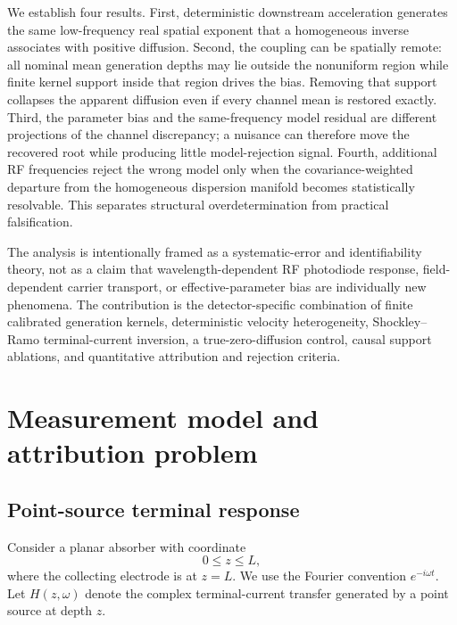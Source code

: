 \documentclass[aps,pra,twocolumn,superscriptaddress,nofootinbib]{revtex4-2}
\begin{document}
We establish four results. First, deterministic downstream acceleration generates the same low-frequency real spatial exponent that a homogeneous inverse associates with positive diffusion. Second, the coupling can be spatially remote: all nominal mean generation depths may lie outside the nonuniform region while finite kernel support inside that region drives the bias. Removing that support collapses the apparent diffusion even if every channel mean is restored exactly. Third, the parameter bias and the same-frequency model residual are different projections of the channel discrepancy; a nuisance can therefore move the recovered root while producing little model-rejection signal. Fourth, additional RF frequencies reject the wrong model only when the covariance-weighted departure from the homogeneous dispersion manifold becomes statistically resolvable. This separates structural overdetermination from practical falsification.

The analysis is intentionally framed as a systematic-error and identifiability theory, not as a claim that wavelength-dependent RF photodiode response, field-dependent carrier transport, or effective-parameter bias are individually new phenomena. The contribution is the detector-specific combination of finite calibrated generation kernels, deterministic velocity heterogeneity, Shockley--Ramo terminal-current inversion, a true-zero-diffusion control, causal support ablations, and quantitative attribution and rejection criteria.

\section{Measurement model and attribution problem}
\label{sec:model}

\subsection{Point-source terminal response}

Consider a planar absorber with coordinate
\begin{equation}
0\le z\le L,
\end{equation}
where the collecting electrode is at $z=L$. We use the Fourier convention $e^{-i\omega t}$. Let $H(z,\omega)$ denote the complex terminal-current transfer generated by a point source at depth $z$.
\end{document}
